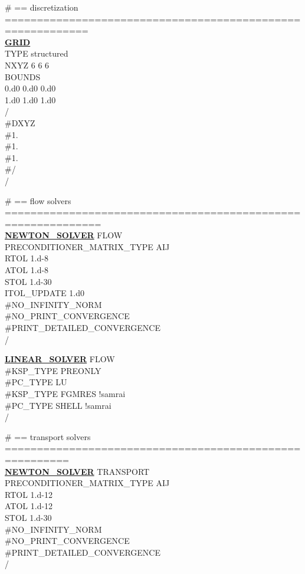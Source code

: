\noindent
\# == discretization ===========================================================\\
\hyperlink{target_grid}{\bf GRID}\\
TYPE structured\\
NXYZ 6 6 6\\
BOUNDS\\
0.d0 0.d0 0.d0\\
1.d0 1.d0 1.d0\\
/\\
\#DXYZ\\
\#1.\\
\#1.\\
\#1.\\
\#/\\
/

\noindent
\# == flow solvers =============================================================\\
\hyperlink{target_newt}{\bf NEWTON\_SOLVER} FLOW\\
PRECONDITIONER\_MATRIX\_TYPE AIJ\\
RTOL 1.d-8\\
ATOL 1.d-8\\
STOL 1.d-30\\
ITOL\_UPDATE 1.d0\\
\#NO\_INFINITY\_NORM\\
\#NO\_PRINT\_CONVERGENCE\\
\#PRINT\_DETAILED\_CONVERGENCE\\
/

\noindent
\hyperlink{target_linsolv}{\bf LINEAR\_SOLVER} FLOW\\
\#KSP\_TYPE PREONLY\\
\#PC\_TYPE LU\\
\#KSP\_TYPE FGMRES !samrai\\
\#PC\_TYPE SHELL !samrai\\
/

\noindent
\# == transport solvers ========================================================\\
\hyperlink{target_newt}{\bf NEWTON\_SOLVER} TRANSPORT\\
PRECONDITIONER\_MATRIX\_TYPE AIJ\\
RTOL 1.d-12\\
ATOL 1.d-12\\
STOL 1.d-30\\
\#NO\_INFINITY\_NORM\\
\#NO\_PRINT\_CONVERGENCE\\
\#PRINT\_DETAILED\_CONVERGENCE\\
/

